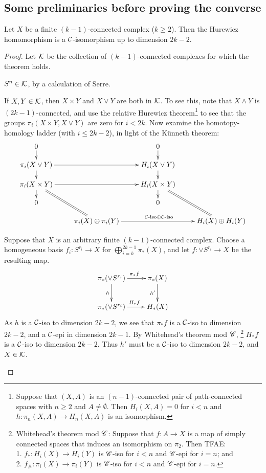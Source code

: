 \documentclass[11pt]{article}
\begin{document}
\begin{SignatureThmTalk}
\subsection*{Some preliminaries before proving the converse}
\begin{thm*}[18.3]
Let $X$ be a finite $(k-1)$-connected complex ($k\geq2$). Then the Hurewicz homomorphism is a $\mathcal{C}$-isomorphism up to dimension $2k-2$.
\end{thm*}
\begin{proof}Let $\mathcal{K}$ be the collection of $(k-1)$-connected complexes for which the theorem holds.
\begin{itemise}
\item $S^n\in\mathcal{K}$, by a calculation of Serre.
\item If $X,Y\in\mathcal{K}$, then $X\times Y$ and $X\vee Y$ are both in $\mathcal{K}$. To see this, note that $X\wedge Y$ is $(2k-1)$-connected, and use the relative Hurewicz theorem\footnote{Suppose that $(X,A)$ is an $(n-1)$-connected pair of path-connected spaces with $n\geq2$ and $A\neq\emptyset$. Then $H_i(X,A)=0$ for $i<n$ and $h:\pi_n(X,A)\to H_n(X,A)$ is an isomorphism.} to see that the groups $\pi_i(X\times Y,X\vee Y)$ are zero for $i<2k$. Now examine the homotopy-homology ladder (with $i\leq2k-2$), in light of the K\"unneth theorem:
\[\xymatrix@R=.4cm{
0\ar[d]&&0\ar[d]\\
\pi_i(X\vee Y)\ar[d]\ar[rr]&&H_i(X\vee Y)\ar[d]\\
\ar[d]\pi_i(X\times Y)\ar@{=}[rdd]\ar[rr]&&H_i(X\times Y)\ar@{=}[rdd]\ar[d]\\
0&&0\\
&\pi_i(X)\oplus\pi_i(Y)\ar[rr]^{\calC\text{-iso}\oplus\calC\text{-iso}}&&H_i(X)\oplus H_i(Y)
}\]
\item Suppose that $X$ is an arbitrary finite $(k-1)$-connected complex. Choose a homogeneous basis $f_i:S^{r_i}\to X$ for $\bigoplus_{i=k}^{2k-1}\pi_*(X)$, and let $f:\vee S^{r_i}\to X$ be the resulting map.
\[\xymatrix{
\ar[d]_h\pi_*(\vee S^{r_i})\ar[r]^{\pi_*f}&\pi_*(X)\ar[d]_{h'}\\
\pi_*(\vee S^{r_i})\ar[r]^{H_*f}&H_*(X)
}\]
As $h$ is a $\mathcal{C}$-iso to dimension $2k-2$, we see that $\pi_*f$ is a $\mathcal{C}$-iso to dimension $2k-2$, and a $\mathcal{C}$-epi in dimension $2k-1$. By Whitehead's theorem mod $\mathscr{C}$,%
\footnote{Whitehead's theorem mod $\mathscr{C}$:
Suppose that $f:A\to X$ is a map of simply connected spaces that induces an isomorphism on $\pi_2$. Then TFAE:\\
\phantom{Space}1. $f_*:H_i(X)\to H_i(Y)$ is $\mathscr{C}$-iso for $i<n$ and $\mathscr{C}$-epi for $i=n$; and\\
\phantom{Space}2. $f_\#:\pi_i(X)\to \pi_i(Y)$ is $\mathscr{C}$-iso for $i<n$ and $\mathscr{C}$-epi for $i=n$.}
$H_*f$ is a $\mathcal{C}$-iso to dimension $2k-2$. Thus $h'$ must be a $\mathcal{C}$-iso  to dimension $2k-2$, and $X\in\mathcal{K}$.\qedhere
\end{itemise}
\end{proof}


\end{SignatureThmTalk}
\end{document}
